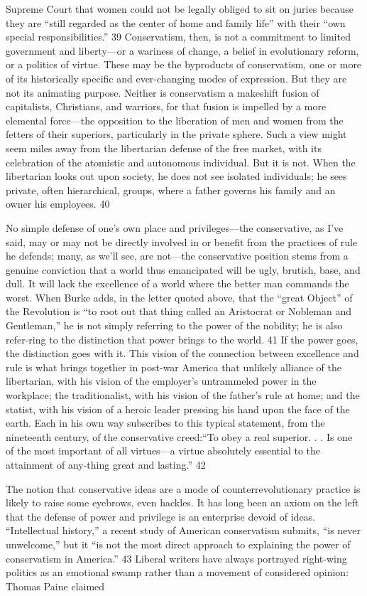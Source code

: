 Supreme Court that women could not be legally obliged to sit on juries because they are “still regarded as the center of home and family life” with their “own special responsibilities.” {\color{blue} 39 } Conservatism, then, is not a commitment to limited government and liberty—or a wariness of change, a belief in evolutionary reform, or a politics of virtue. These may be the byproducts of conservatism, one or more of its historically specific and ever-changing modes of expression. But they are not its animating purpose. Neither is conservatism a makeshift fusion of capitalists, Christians, and warriors, for that fusion is impelled by a more elemental force—the opposition to the liberation of men and women from the fetters of their superiors, particularly in the private sphere. Such a view might seem miles away from the libertarian defense of the free market, with its celebration of the atomistic and autonomous individual. But it is not. When the libertarian looks out upon society, he does not see isolated individuals; he sees private, often hierarchical, groups, where a father governs his family and an owner his employees. {\color{blue} 40 } {\par} No simple defense of one’s own place and privileges—the conservative, as I’ve said, may or may not be directly involved in or benefit from the practices of rule he defends; many, as we’ll see, are not—the conservative position stems from a genuine conviction that a world thus emancipated will be ugly, brutish, base, and dull. It will lack the excellence of a world where the better man commands the worst. When Burke adds, in the letter quoted above, that the “great Object” of the Revolution is “to root out that thing called an Aristocrat or Nobleman and Gentleman,” he is not simply referring to the power of the nobility; he is also refer-ring to the distinction that power brings to the world. {\color{blue} 41 } If the power goes, the distinction goes with it. This vision of the connection between excellence and rule is what brings together in post-war America that unlikely alliance of the libertarian, with his vision of the employer’s untrammeled power in the workplace; the traditionalist, with his vision of the father’s rule at home; and the statist, with his vision of a heroic leader pressing his hand upon the face of the earth. Each in his own way subscribes to this typical statement, from the nineteenth century, of the conservative creed:“To obey a real superior. . . Is one of the most important of all virtues—a virtue absolutely essential to the attainment of any-thing great and lasting.” {\color{blue} 42 } {\par} The notion that conservative ideas are a mode of counterrevolutionary practice is likely to raise some eyebrows, even hackles. It has long been an axiom on the left that the defense of power and privilege is an enterprise devoid of ideas. “Intellectual history,” a recent study of American conservatism submits, “is never unwelcome,” but it “is not the most direct approach to explaining the power of conservatism in America.” {\color{blue} 43 } Liberal writers have always portrayed right-wing politics as an emotional swamp rather than a movement of considered opinion: Thomas Paine claimed 